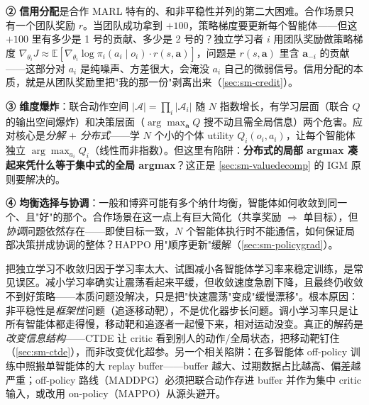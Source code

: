 \textbf{② 信用分配}是合作 MARL 特有的、和非平稳性并列的第二大困难。合作场景只有一个团队奖励 $r$。当团队成功拿到 $+100$，策略梯度要更新每个智能体——但这 $+100$ 里有多少是 1 号的贡献、多少是 2 号的？独立学习者 $i$ 用团队奖励做策略梯度 $\nabla_{\theta_i}J\approx\mathbb{E}[\nabla_{\theta_i}\log\pi_i(a_i\mid o_i)\cdot r(s,\mathbf{a})]$，问题是 $r(s,\mathbf{a})$ 里含 $\mathbf{a}_{-i}$ 的贡献——这部分对 $a_i$ 是纯噪声、方差很大，会淹没 $a_i$ 自己的微弱信号。信用分配的本质，就是从团队奖励里把"我的那一份"剥离出来（\cref{sec:sm-credit}）。

\textbf{③ 维度爆炸}：联合动作空间 $|\boldsymbol{\mathcal{A}}|=\prod_i|\mathcal{A}_i|$ 随 $N$ 指数增长，有学习层面（联合 $Q$ 的输出空间爆炸）和决策层面（$\arg\max_{\mathbf{a}}Q$ 搜不动且需全局信息）两个危害。应对核心是\emph{分解 $+$ 分布式}——学 $N$ 个小的个体 utility $Q_i(o_i,a_i)$，让每个智能体独立 $\arg\max_{a_i}Q_i$（线性而非指数）。但这里有陷阱：\textbf{分布式的局部 argmax 凑起来凭什么等于集中式的全局 argmax}？这正是 \cref{sec:sm-valuedecomp} 的 IGM 原则要解决的。

\textbf{④ 均衡选择与协调}：一般和博弈可能有多个纳什均衡，智能体如何收敛到同一个、且"好"的那个。合作场景在这一点上有巨大简化（共享奖励 $\Rightarrow$ 单目标），但\emph{协调}问题依然存在——即使目标一致，$N$ 个智能体执行时不能通信，如何保证局部决策拼成协调的整体？HAPPO 用"顺序更新"缓解（\cref{sec:sm-policygrad}）。

\begin{pitfall}
把独立学习不收敛归因于学习率太大、试图减小各智能体学习率来稳定训练，是常见误区。减小学习率确实让震荡看起来平缓，但收敛速度急剧下降，且最终仍收敛不到好策略——本质问题没解决，只是把"快速震荡"变成"缓慢漂移"。根本原因：非平稳性是\emph{框架性}问题（追逐移动靶），不是优化器步长问题。调小学习率只是让所有智能体都走得慢，移动靶和追逐者一起慢下来，相对运动没变。真正的解药是\emph{改变信息结构}——CTDE 让 critic 看到别人的动作/全局状态，把移动靶钉住（\cref{sec:sm-ctde}），而非改变优化超参。另一个相关陷阱：在多智能体 off-policy 训练中照搬单智能体的大 replay buffer——buffer 越大、过期数据占比越高、偏差越严重；off-policy 路线（MADDPG）必须把联合动作存进 buffer 并作为集中 critic 输入，或改用 on-policy（MAPPO）从源头避开。
\end{pitfall}

